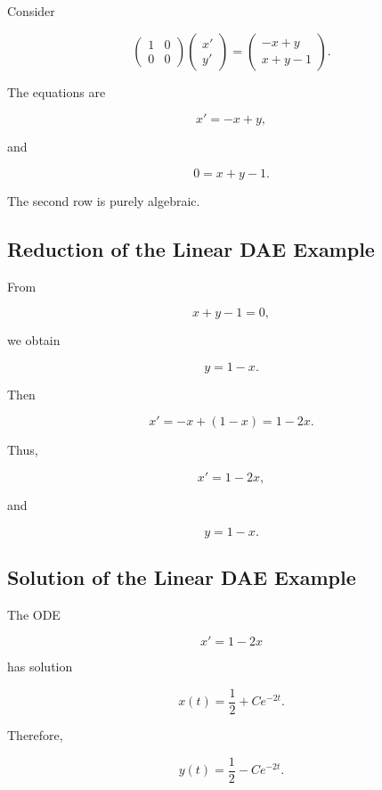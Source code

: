 Consider

\[
\boxed{
\begin{pmatrix}
1&0\\
0&0
\end{pmatrix}
\begin{pmatrix}
x'\\
y'
\end{pmatrix}
=
\begin{pmatrix}
-x+y\\
x+y-1
\end{pmatrix}.
}
\]

The equations are

\[
\boxed{
x'=-x+y,
}
\]

and

\[
\boxed{
0=x+y-1.
}
\]

The second row is purely algebraic.

\subsection{Reduction of the Linear DAE Example}
\label{subsec:reduction-linear-dae-example}

From

\[
x+y-1=0,
\]

we obtain

\[
y=1-x.
\]

Then

\[
x'
=
-x+(1-x)
=
1-2x.
\]

Thus,

\[
\boxed{
x'=1-2x,
}
\]

and

\[
\boxed{
y=1-x.
}
\]

\subsection{Solution of the Linear DAE Example}
\label{subsec:solution-linear-dae-example}

The ODE

\[
x'=1-2x
\]

has solution

\[
\boxed{
x(t)
=
\frac12
+
Ce^{-2t}.
}
\]

Therefore,

\[
\boxed{
y(t)
=
\frac12
-
Ce^{-2t}.
}
\]

